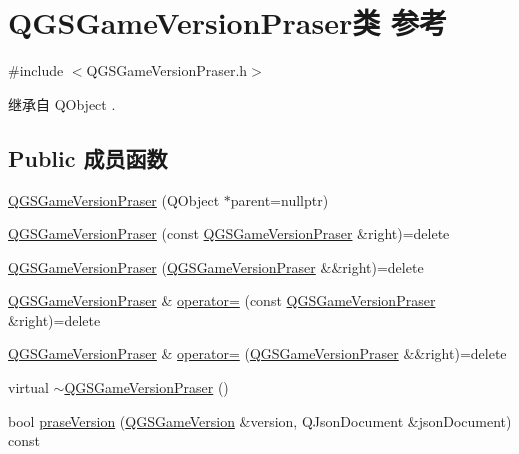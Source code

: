 \hypertarget{class_q_g_s_game_version_praser}{}\section{Q\+G\+S\+Game\+Version\+Praser类 参考}
\label{class_q_g_s_game_version_praser}


{\ttfamily \#include $<$Q\+G\+S\+Game\+Version\+Praser.\+h$>$}



继承自 Q\+Object .

\subsection*{Public 成员函数}
\begin{DoxyCompactItemize}
\item 
\mbox{\hyperlink{class_q_g_s_game_version_praser_adb476a6e2027091c6e78c4bae82d60c6}{Q\+G\+S\+Game\+Version\+Praser}} (Q\+Object $\ast$parent=nullptr)
\item 
\mbox{\hyperlink{class_q_g_s_game_version_praser_a05a0945a6b63e002861bc50e00f14600}{Q\+G\+S\+Game\+Version\+Praser}} (const \mbox{\hyperlink{class_q_g_s_game_version_praser}{Q\+G\+S\+Game\+Version\+Praser}} \&right)=delete
\item 
\mbox{\hyperlink{class_q_g_s_game_version_praser_aafef4620ad6087686d2b03329aba1f44}{Q\+G\+S\+Game\+Version\+Praser}} (\mbox{\hyperlink{class_q_g_s_game_version_praser}{Q\+G\+S\+Game\+Version\+Praser}} \&\&right)=delete
\item 
\mbox{\hyperlink{class_q_g_s_game_version_praser}{Q\+G\+S\+Game\+Version\+Praser}} \& \mbox{\hyperlink{class_q_g_s_game_version_praser_af63cf8dc5e5c84896ea29727448b0206}{operator=}} (const \mbox{\hyperlink{class_q_g_s_game_version_praser}{Q\+G\+S\+Game\+Version\+Praser}} \&right)=delete
\item 
\mbox{\hyperlink{class_q_g_s_game_version_praser}{Q\+G\+S\+Game\+Version\+Praser}} \& \mbox{\hyperlink{class_q_g_s_game_version_praser_a268ac51f9532bab7707b46caffbbca4d}{operator=}} (\mbox{\hyperlink{class_q_g_s_game_version_praser}{Q\+G\+S\+Game\+Version\+Praser}} \&\&right)=delete
\item 
virtual \mbox{\hyperlink{class_q_g_s_game_version_praser_a1764586e9244b9b29ba7335839c283e0}{$\sim$\+Q\+G\+S\+Game\+Version\+Praser}} ()
\item 
bool \mbox{\hyperlink{class_q_g_s_game_version_praser_a32896aaae8ca4d46ddb21c5119edbbca}{prase\+Version}} (\mbox{\hyperlink{class_q_g_s_game_version}{Q\+G\+S\+Game\+Version}} \&version, Q\+Json\+Document \&json\+Document) const
\end{DoxyCompactItemize}


